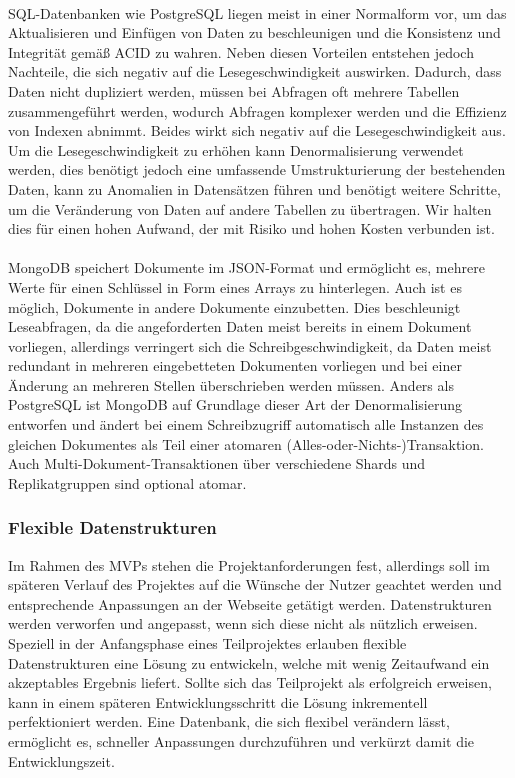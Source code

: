\paragraph{}
SQL-Datenbanken wie PostgreSQL liegen meist in einer Normalform vor, um das Aktualisieren und Einfügen von Daten zu beschleunigen und die Konsistenz und Integrität gemäß ACID zu wahren. Neben diesen Vorteilen entstehen jedoch Nachteile, die sich negativ auf die Lesegeschwindigkeit auswirken. Dadurch, dass Daten nicht dupliziert werden, müssen bei Abfragen oft mehrere Tabellen zusammengeführt werden, wodurch Abfragen komplexer werden und die Effizienz von Indexen abnimmt. Beides wirkt sich negativ auf die Lesegeschwindigkeit aus. Um die Lesegeschwindigkeit zu erhöhen kann Denormalisierung verwendet werden, dies benötigt jedoch eine umfassende Umstrukturierung der bestehenden Daten, kann zu Anomalien in Datensätzen führen und benötigt weitere Schritte, um die Veränderung von Daten auf andere Tabellen zu übertragen. Wir halten dies für einen hohen Aufwand, der mit Risiko und hohen Kosten verbunden ist. 

\paragraph{}
MongoDB speichert Dokumente im JSON-Format und ermöglicht es, mehrere Werte für einen Schlüssel in Form eines Arrays zu hinterlegen. Auch ist es möglich, Dokumente in andere Dokumente einzubetten. Dies beschleunigt Leseabfragen, da die angeforderten Daten meist bereits in einem Dokument vorliegen, allerdings verringert sich die Schreibgeschwindigkeit, da Daten meist redundant in mehreren eingebetteten Dokumenten vorliegen und bei einer Änderung an mehreren Stellen überschrieben werden müssen. Anders als PostgreSQL ist MongoDB auf Grundlage dieser Art der Denormalisierung entworfen und ändert bei einem Schreibzugriff automatisch alle Instanzen des gleichen Dokumentes als Teil einer atomaren (Alles-oder-Nichts-)Transaktion. Auch Multi-Dokument-Transaktionen über verschiedene Shards und Replikatgruppen sind optional atomar. \cite{MG1}

\subsubsection{Flexible Datenstrukturen}
Im Rahmen des MVPs stehen die Projektanforderungen fest, allerdings soll im späteren Verlauf des Projektes auf die Wünsche der Nutzer geachtet werden und entsprechende Anpassungen an der Webseite getätigt werden. Datenstrukturen werden verworfen und angepasst, wenn sich diese nicht als nützlich erweisen. Speziell in der Anfangsphase eines Teilprojektes erlauben flexible Datenstrukturen eine Lösung zu entwickeln, welche mit wenig Zeitaufwand ein akzeptables Ergebnis liefert. Sollte sich das Teilprojekt als erfolgreich erweisen, kann in einem späteren Entwicklungsschritt die Lösung inkrementell perfektioniert werden. Eine Datenbank, die sich flexibel verändern lässt, ermöglicht es, schneller Anpassungen durchzuführen und verkürzt damit die Entwicklungszeit.

